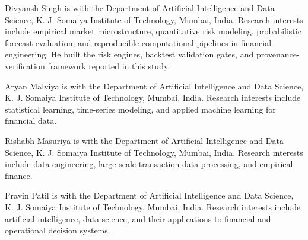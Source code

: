 \documentclass{ieeeaccess}
\begin{document}
\begin{IEEEbiographynophoto}{Divyansh Singh}
is with the Department of Artificial Intelligence and Data Science, K. J. Somaiya Institute of Technology, Mumbai, India. Research interests include empirical market microstructure, quantitative risk modeling, probabilistic forecast evaluation, and reproducible computational pipelines in financial engineering. He built the risk engines, backtest validation gates, and provenance-verification framework reported in this study.
\end{IEEEbiographynophoto}

\begin{IEEEbiographynophoto}{Aryan Malviya}
is with the Department of Artificial Intelligence and Data Science, K. J. Somaiya Institute of Technology, Mumbai, India. Research interests include statistical learning, time-series modeling, and applied machine learning for financial data.
\end{IEEEbiographynophoto}

\begin{IEEEbiographynophoto}{Rishabh Masuriya}
is with the Department of Artificial Intelligence and Data Science, K. J. Somaiya Institute of Technology, Mumbai, India. Research interests include data engineering, large-scale transaction data processing, and empirical finance.
\end{IEEEbiographynophoto}

\begin{IEEEbiographynophoto}{Pravin Patil}
is with the Department of Artificial Intelligence and Data Science, K. J. Somaiya Institute of Technology, Mumbai, India. Research interests include artificial intelligence, data science, and their applications to financial and operational decision systems.
\end{IEEEbiographynophoto}

\EOD
\end{document}
